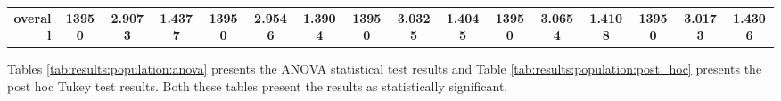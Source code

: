 \begin{table}[htbp]
{\begin{tabular}{rccccccccccccccc}
    \midrule
    \textbf{overall} & \textbf{13950} & \cellcolor[rgb]{ .776,  .937,  .808}\textcolor[rgb]{ 0,  .38,  0}{\textbf{2.9073}} & \textbf{1.4377} & \textbf{13950} & \textbf{2.9546} & \textbf{1.3904} & \textbf{13950} & \textbf{3.0325} & \textbf{1.4045} & \textbf{13950} & \textbf{3.0654} & \textbf{1.4108} & \textbf{13950} & \textbf{3.0173} & \textbf{1.4306} \\
    \end{tabular}%
    }
\end{table}%

Tables \ref{tab:results:population:anova} presents the ANOVA statistical test results and Table \ref{tab:results:population:post_hoc} presents the post hoc Tukey test results. Both these tables present the results as statistically significant.


\begin{table}[htbp]
	\centering
	\caption{ANOVA - Rank - BHH Variant: Population}
	\label{tab:results:population:anova}%
	\par\bigskip

\end{table}


